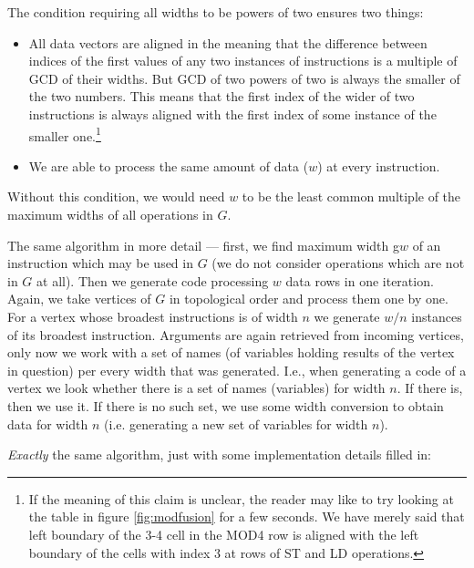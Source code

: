 \begin{rem}
  The condition requiring all widths to be powers of two ensures two things:
  \begin{itemize}
    \item All data vectors are aligned in the meaning that the difference between indices of the first values of any two instances of instructions is a multiple of GCD of their widths. But GCD of two powers of two is always the smaller of the two numbers. This means that the first index of the wider of two instructions is always aligned with the first index of some instance of the smaller one.\footnote{If the meaning of this claim is unclear, the reader may like to try looking at the table in figure \ref{fig:modfusion} for a few seconds. We have merely said that left boundary of the 3-4 cell in the MOD4 row is aligned with the left boundary of the cells with index 3 at rows of ST and LD operations.}
    \item We are able to process the same amount of data ($w$) at every instruction.
  \end{itemize}
  Without this condition, we would need $w$ to be the least common multiple of the maximum widths of all operations in $G$. 
\end{rem}

The same algorithm in more detail --- first, we find maximum width g$w$ of an instruction which may be used in $G$ (we do not consider operations which are not in $G$ at all). Then we generate code processing $w$ data rows in one iteration. Again, we take vertices of $G$ in topological order and process them one by one. For a vertex whose broadest instructions is of width $n$ we generate $w/n$ instances of its broadest instruction. Arguments are again retrieved from incoming vertices, only now we work with a set of names (of variables holding  results of the vertex in question) per every width that was generated. I.e., when generating a code of a vertex we look whether there is a set of names (variables) for width $n$. If there is, then we use it. If there is no such set, we use some width conversion to obtain data for width $n$ (i.e. generating a new set of variables for width $n$). 

\emph{Exactly} the same algorithm, just with some implementation details filled in:

